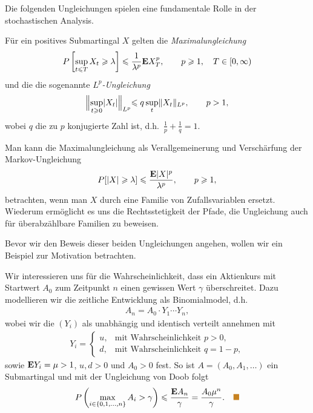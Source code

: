 Die folgenden Ungleichungen spielen eine fundamentale Rolle in der
stochastischen Analysis. 

\begin{prop}
\label{prop:1.19}
Für ein positives Submartingal $X$ gelten die \emph{Maximalungleichung}
\begin{align*}
P\left[ \sup_{t\leqslant T} X_t \geqslant \lambda \right] \leqslant \frac{1}{\lambda^p} \mathbf{E}
X_T^p,\qquad p \geqslant 1,\quad T\in [0,\infty)
\end{align*}
und die die sogenannte \emph{$L^p$-Ungleichung} 
\begin{align*}
\Bigl\|\sup_{t\geqslant 0} \lvert X_t\rvert
\Bigl\|_{L^p} \leqslant q \sup_t \lVert X_t\rVert_{L^p},\qquad p > 1,
\end{align*}
wobei $q$ die zu $p$ konjugierte Zahl ist, d.h.\
$\frac{1}{p}+\frac{1}{q}=1$.\fish
\end{prop}

Man kann die Maximalungleichung als Verallgemeinerung und Verschärfung
der Markov-Ungleichung 
\begin{align*}
P[\lvert X\rvert \geqslant \lambda] \leqslant \frac{\mathbf{E} \lvert X\rvert^p}{\lambda^p},\qquad p\geqslant 1,
\end{align*}
betrachten, wenn man $X$ durch eine Familie von Zufallsvariablen ersetzt.
Wiederum ermöglicht es uns die Rechtsstetigkeit der Pfade, die Ungleichung auch
für überabzählbare Familien zu beweisen.

Bevor wir den Beweis dieser beiden Ungleichungen angehen, wollen wir ein
Beispiel zur Motivation betrachten.

\begin{ex}
Wir interessieren uns für die Wahrscheinlichkeit, dass ein Aktienkurs mit
Startwert $A_0$ zum Zeitpunkt $n$ einen gewissen Wert $\gamma$ überschreitet.
Dazu modellieren wir die zeitliche Entwicklung als Binomialmodel, d.h.
\begin{align*}
A_n = A_0\cdot Y_1 \cdots Y_n,
\end{align*}
wobei wir die $(Y_i)$ als unabhängig und identisch verteilt annehmen mit
\begin{align*}
Y_i = \begin{cases}
u, & \text{mit Wahrscheinlichkeit }p > 0,\\
d, & \text{mit Wahrscheinlichkeit }q=1-p,
\end{cases}
\end{align*}
sowie $\mathbf{E} Y_i = \mu > 1$, $u,d > 0$ und $A_0 > 0$ fest. So ist
$A=(A_0,A_1,\ldots)$ ein Submartingal und mit der Ungleichung von Doob folgt
\begin{align*}
P\left(\max\limits_{i\in\setd{0,1,\ldots,n}} A_i > \gamma \right) \le \frac{\E
A_n}{\gamma} = \frac{A_0\mu^n}{\gamma}.\bsp
\end{align*}
\end{ex}


